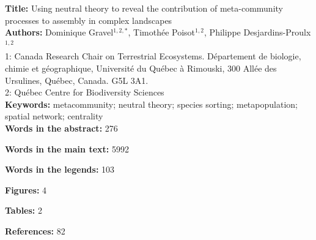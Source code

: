 \documentclass[12pt]{article}
\begin{document}
\linenumbers 
\modulolinenumbers[1]

\textbf{Title:} Using neutral theory to reveal the contribution of meta-community processes to assembly in complex landscapes\\

\textbf{Authors:} Dominique Gravel$^{1,2,*}$, Timoth\'ee Poisot$^{1,2}$, Philippe Desjardins-Proulx$^{1,2}$\\

1: Canada Research Chair on Terrestrial Ecosystems. D\'epartement de biologie, chimie et g\'eographique, Universit\'e du Qu\'ebec \`a Rimouski, 300 All\'ee des Ursulines, Qu\'ebec, Canada. G5L 3A1.\\

2: Qu\'ebec Centre for Biodiversity Sciences\\

\textbf{Keywords:} metacommunity; neutral theory; species sorting; metapopulation; spatial network; centrality \\

\textbf{Words in the abstract:}   276

\textbf{Words in the main text:}  5992

\textbf{Words in the legends:}   103

\textbf{Figures:} 4 

\textbf{Tables:} 2          

\textbf{References:} 82

\newpage
\doublespacing

\end{document}
